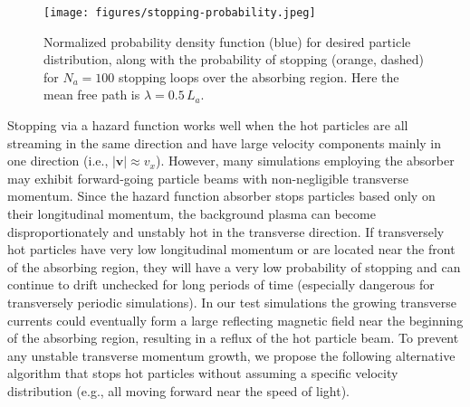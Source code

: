 \documentclass[../absorber.tex]{subfiles}
\begin{document}
\begin{figure}
\texttt{[image: figures/stopping-probability.jpeg]}
\caption{\label{fig:f-and-h} Normalized probability density function (blue) for desired particle distribution, along with the probability of stopping (orange, dashed) for $N_a=100$ stopping loops over the absorbing region. Here the mean free path is $\lambda=0.5\,L_a$.}
\end{figure}



Stopping via a hazard function works well when the hot particles are all streaming in the same direction and have large velocity components mainly in one direction (i.e., $|\mathbf{v}| \approx v_x$).
However, many simulations employing the absorber may exhibit forward-going particle beams with non-negligible transverse momentum.  Since the hazard function absorber stops particles based only on their longitudinal momentum, the background plasma can become disproportionately and unstably hot in the transverse direction.  If transversely hot particles have very low longitudinal momentum or are located near the front of the absorbing region, they will have a very low probability of stopping and can continue to drift unchecked for long periods of time (especially dangerous for transversely periodic simulations).  In our test simulations the growing transverse currents could eventually form a large reflecting magnetic field near the beginning of the absorbing region, resulting in a reflux of the hot particle beam.  To prevent any unstable transverse momentum growth, we propose the following alternative algorithm that stops hot particles without assuming a specific velocity distribution (e.g., all moving forward near the speed of light).
\end{document}
